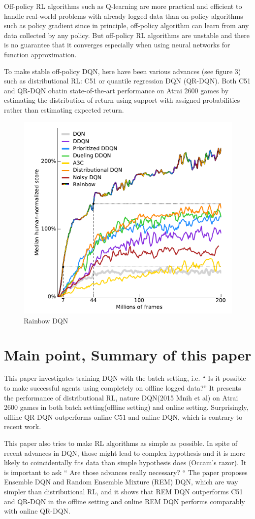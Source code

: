 \documentclass{article}
\begin{document}
Off-policy RL algorithms such as Q-learning are more practical and efficient to handle real-world problems with already logged data than on-policy algorithms such as policy gradient since in principle, off-policy algorithm can learn from any data collected by any policy. But off-policy RL algorithms are unstable and there is no guarantee that it converges especially when using neural networks for function approximation.

To make stable off-policy DQN, here have been various advances (see figure 3) such as distributional RL: C51 or quantile regression DQN (QR-DQN). Both C51 and QR-DQN obatin state-of-the-art performance on Atrai 2600 games by estimating the distribution of return using support with assigned probabilities rather than estimating expected return.

\begin{figure}[H]
  \centering
    \includegraphics[width=0.4\linewidth]{0_2.png}
  \caption{Rainbow DQN}
\end{figure}

\section{Main point, Summary of this paper}

This paper investigates training DQN with the batch setting, i.e. “ Is it possible to make successful agents using completely on offline logged data?” It presents the performance of distributional RL, nature DQN(2015 Mnih et al) on Atrai 2600 games in both batch setting(offline setting) and online setting. Surprisingly, offline QR-DQN outperforms online C51 and online DQN, which is contrary to recent work.

This paper also tries to make RL algorithms as simple as possible. In spite of recent advances in DQN, those might lead to complex hypothesis and it is more likely to coincidentally fits data than simple hypothesis does (Occam’s razor). It is important to ask “ Are those advances really necessary? “ The paper proposes Ensemble DQN and Random Ensemble Mixture (REM) DQN, which are way simpler than distributional RL, and it shows that REM DQN outperforms C51 and QR-DQN in the offline setting and online REM DQN performs comparably with online QR-DQN.
\end{document}
